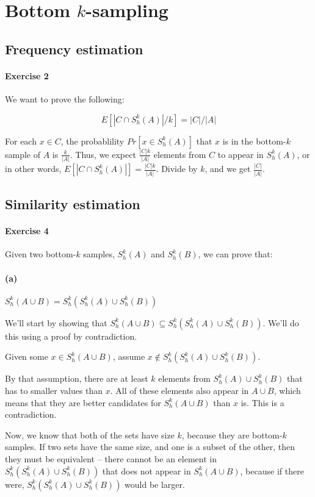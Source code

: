 \section{Bottom $k$-sampling}

\subsection{Frequency estimation}

\paragraph{Exercise 2}
We want to prove the following:

\[
    E[|C \cap S^k_h(A)|/k] = |C|/|A|
\]

For each $x \in C$, the probablility $Pr[x \in S^k_h(A)]$ that $x$ is in the bottom-$k$ sample of $A$ is $\frac{k}{|A|}$. Thus, we expect $\frac{|C|k}{|A|}$ elements from $C$ to appear in $S^k_h(A)$, or in other words, $E[|C \cap S^k_h(A)|] = \frac{|C|k}{|A|}$. Divide by $k$, and we get $\frac{|C|}{|A|}$. 

\subsection{Similarity estimation}

\paragraph{Exercise 4}
Given two bottom-$k$ samples, $S^k_h(A)$ and $S^k_h(B)$, we can prove that:

\paragraph*{(a)}
$S^k_h(A \cup B) = S^k_h(S^k_h(A) \cup S^k_h(B))$

We'll start by showing that $S^k_h(A \cup B) \subseteq S^k_h(S^k_h(A) \cup S^k_h(B))$. We'll do this using a proof by contradiction.

Given some $x \in S^k_h(A \cup B)$, assume $x \notin S^k_h(S^k_h(A) \cup S^k_h(B))$.

By that assumption, there are at least $k$ elements from $S^k_h(A) \cup S^k_h(B)$ that has to smaller values than $x$. All of these elements also appear in $A \cup B$, which means that they are better candidates for $S^k_h(A \cup B)$ than $x$ is. This is a contradiction.

Now, we know that both of the sets have size $k$, because they are bottom-$k$ samples. If two sets have the same size, and one is a subset of the other, then they must be equivalent -- there cannot be an element in $S^k_h(S^k_h(A) \cup S^k_h(B))$ that does not appear in $S^k_h(A \cup B)$, because if there were, $S^k_h(S^k_h(A) \cup S^k_h(B))$ would be larger.

